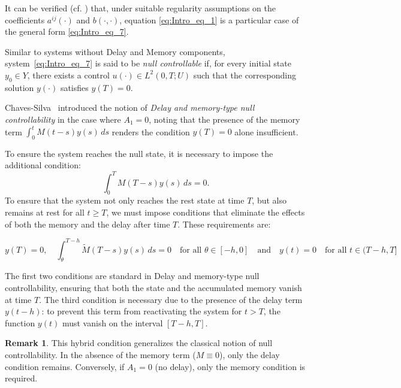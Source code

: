 \documentclass[12pt]{article}
\theoremstyle{plain}
\theoremstyle{definition}
\newtheorem{remark}{Remark}[section]
\begin{document}
It can be verified (cf. \cite{yong2011heat}) that, under suitable regularity assumptions on the coefficients $a^{ij}(\cdot)$ and $b(\cdot,\cdot)$, equation \eqref{eq:Intro_eq_1} is a particular case of the general form \eqref{eq:Intro_eq_7}.

Similar to systems without Delay and Memory components, system~\eqref{eq:Intro_eq_7} is said to be \emph{null controllable} if, for every initial state $y_0 \in Y$, there exists a control $u(\cdot) \in L^2(0,T;U)$ such that the corresponding solution $y(\cdot)$ satisfies $y(T) = 0$.

Chaves-Silva~\cite{chaves2017controllability} introduced the notion of \emph{Delay and memory-type null controllability} in the case where $A_1 = 0$, noting that the presence of the memory term $\int_0^t M(t-s)y(s)\,ds$ renders the condition $y(T) = 0$ alone insufficient.

To ensure the system reaches the null state, it is necessary to impose the additional condition:
\begin{equation}
\label{eq:Intro_eq_8}
\int_0^T M(T - s)y(s)\,ds = 0.
\end{equation}
To ensure that the system not only reaches the rest state at time $T$, but also remains at rest for all $t \geq T$, we must impose conditions that eliminate the effects of both the memory and the delay after time $T$. These requirements are:

\begin{equation}
\label{eq:memory_delay_condition}
  y(T) = 0 , \quad \int_{\theta}^{T-h} \widetilde{M}(T - s)y(s)\,ds = 0 \quad \text{for all } \theta \in [-h, 0] \quad \text{and}\quad  y(t) = 0 \quad \text{for all } t \in (T - h, T]
\end{equation}

The first two conditions are standard in Delay and memory-type null controllability, ensuring that both the state and the accumulated memory vanish at time $T$. The third condition is necessary due to the presence of the delay term $y(t - h)$: to prevent this term from reactivating the system for $t > T$, the function $y(t)$ must vanish on the interval $[T - h, T]$.


\begin{remark}
    This hybrid condition generalizes the classical notion of null controllability. In the absence of the memory term ($M \equiv 0$), only the delay condition remains. Conversely, if $A_1 = 0$ (no delay), only the memory condition is required.
\end{remark}
\end{document}
